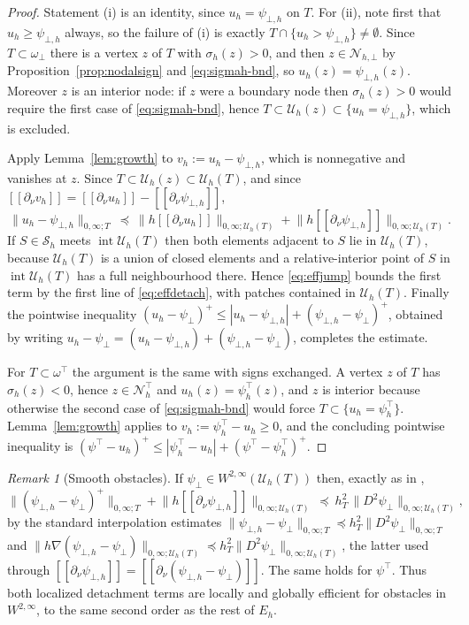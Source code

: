 \documentclass[12pt]{amsart}
\numberwithin{equation}{section}
\theoremstyle{plain}
\theoremstyle{definition}
\theoremstyle{remark}
\newtheorem{remark}[theorem]{Remark}
\newcommand{\psilo}{\psi_\bot}
\newcommand{\psiup}{\psi^\top}
\newcommand{\psiloh}{\psi_{\bot,h}}
\newcommand{\psiuph}{\psi^\top_h}
\newcommand{\Nh}{\mathcal{N}_h}
\newcommand{\Sh}{\mathcal{S}_h}
\newcommand{\Uh}{\mathcal{U}_h}
\newcommand{\jump}[1]{[\![#1]\!]}
\newcommand{\Nhbot}{\mathcal{N}_{h,\bot}}
\newcommand{\Nhtop}{\Nh^\top}
\newcommand{\ombot}{\omega_\bot}
\newcommand{\omtop}{\omega^\top}
\begin{document}
\begin{proof}
Statement (i) is an identity, since $u_h = \psiloh$ on $T$.  For (ii), note first that $u_h \ge \psiloh$ always, so the failure of (i) is exactly $T \cap \{u_h > \psiloh\} \ne \emptyset$.  Since $T \subset \ombot$ there is a vertex $z$ of $T$ with $\sigma_h(z) > 0$, and then $z \in \Nhbot$ by Proposition~\ref{prop:nodalsign} and \eqref{eq:sigmah-bnd}, so $u_h(z) = \psiloh(z)$.  Moreover $z$ is an interior node: if $z$ were a boundary node then $\sigma_h(z) > 0$ would require the first case of \eqref{eq:sigmah-bnd}, hence $T \subset \Uh(z) \subset \{u_h = \psiloh\}$, which is excluded.

Apply Lemma~\ref{lem:growth} to $v_h := u_h - \psiloh$, which is nonnegative and vanishes at $z$.  Since $T \subset \Uh(z) \subset \Uh(T)$, and since $\jump{\partial_\nu v_h} = \jump{\partial_\nu u_h} - \jump{\partial_\nu \psiloh}$,
\[
  \|u_h - \psiloh\|_{0,\infty;T} \ \preceq\ \bigl\|h\jump{\partial_\nu u_h}\bigr\|_{0,\infty;\Uh(T)} + \bigl\|h\jump{\partial_\nu \psiloh}\bigr\|_{0,\infty;\Uh(T)}.
\]
If $S \in \Sh$ meets $\operatorname{int}\Uh(T)$ then both elements adjacent to $S$ lie in $\Uh(T)$, because $\Uh(T)$ is a union of closed elements and a relative-interior point of $S$ in $\operatorname{int}\Uh(T)$ has a full neighbourhood there.  Hence \eqref{eq:effjump} bounds the first term by the first line of \eqref{eq:effdetach}, with patches contained in $\Uh(T)$.  Finally the pointwise inequality $(u_h - \psilo)^+ \le |u_h - \psiloh| + (\psiloh-\psilo)^+$, obtained by writing $u_h - \psilo = (u_h-\psiloh) + (\psiloh-\psilo)$, completes the estimate.

For $T \subset \omtop$ the argument is the same with signs exchanged.  A vertex $z$ of $T$ has $\sigma_h(z) < 0$, hence $z \in \Nhtop$ and $u_h(z) = \psiuph(z)$, and $z$ is interior because otherwise the second case of \eqref{eq:sigmah-bnd} would force $T \subset \{u_h = \psiuph\}$.  Lemma~\ref{lem:growth} applies to $v_h := \psiuph - u_h \ge 0$, and the concluding pointwise inequality is $(\psiup - u_h)^+ \le |\psiuph - u_h| + (\psiup - \psiuph)^+$.
\end{proof}

\begin{remark}[Smooth obstacles]
\label{rem:smoothobstacles}
If $\psilo \in W^{2,\infty}(\Uh(T))$ then, exactly as in \cite[Remark 6.5]{NSV03},
\[
  \|(\psiloh-\psilo)^+\|_{0,\infty;T} + \bigl\|h\jump{\partial_\nu \psiloh}\bigr\|_{0,\infty;\Uh(T)} \ \preceq\ h_T^2\,\|D^2\psilo\|_{0,\infty;\Uh(T)},
\]
by the standard interpolation estimates $\|\psiloh - \psilo\|_{0,\infty;T} \preceq h_T^2\|D^2\psilo\|_{0,\infty;T}$ and $\|h\nabla(\psiloh-\psilo)\|_{0,\infty;\Uh(T)} \preceq h_T^2\|D^2\psilo\|_{0,\infty;\Uh(T)}$, the latter used through $\jump{\partial_\nu\psiloh} = \jump{\partial_\nu(\psiloh-\psilo)}$.  The same holds for $\psiup$.  Thus both localized detachment terms are locally and globally efficient for obstacles in $W^{2,\infty}$, to the same second order as the rest of $E_h$.
\end{remark}
\end{document}

